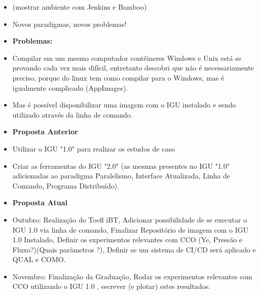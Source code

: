 \documentclass[10pt]{beamer}
\theoremstyle{remark}
\theoremstyle{definition}
\begin{document}
\begin{frame}[allowframebreaks]
\begin{itemize}
		\item (mostrar ambiente com Jenkins e Bamboo)
		
		\item Novos paradigmas, novos problemas!
		
	\end{itemize}
	
	\framebreak
	
	\begin{itemize}
		\item \textbf{Problemas: } 

		\item Compilar em um mesmo computador contêineres Windows e Unix está se provando cada vez mais difícil, entretanto descobri que não é necessariamente preciso, porque do linux tem como compilar para o Windows, mas é igualmente complicado (AppImages).
		
		\item Mas é possível disponibilizar uma imagem com o IGU instalado e sendo utilizado através da linha de comando.
	\end{itemize}
	
	
	\framebreak
	
	\begin{itemize}
		\item \textbf{Proposta Anterior} 
		\item Utilizar o IGU "1.0" para realizar os estudos de caso
		\item Criar as ferramentas do IGU "2.0" (as mesmas presentes no IGU "1.0" adicionadas ao paradigma Paralelismo, Interface Atualizada, Linha de Comando, Programa Distribuído).
		
		
	\end{itemize}
	
	
	\framebreak
	
	\begin{itemize}
		\item \textbf{Proposta Atual}
		\item Outubro: Realização do Toefl iBT, Adicionar possibilidade de se executar o IGU 1.0 via linha de comando, Finalizar Repositório de imagem com o IGU 1.0 Instalado, Definir os experimentos relevantes com CCO (Ye, Pressão e Fluxo?)(Quais parâmetros ?), Definir se um sistema de CI/CD será aplicado e QUAL e COMO.
		
		\item Novembro: Finalização da Graduação, Rodar os experimentos relevantes com CCO utilizando o IGU 1.0 , escrever (e plotar) estes resultados.
		

\end{itemize}
\end{frame}
\end{document}
